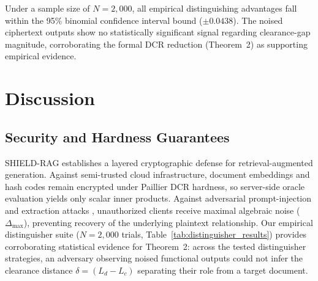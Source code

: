 \documentclass[10pt,a4paper]{article}
\begin{document}
Under a sample size of $N=2{,}000$, all empirical distinguishing advantages fall within the 95\% binomial confidence interval bound ($\pm 0.0438$). The noised ciphertext outputs show no statistically significant signal regarding clearance-gap magnitude, corroborating the formal DCR reduction (Theorem~2) as supporting empirical evidence.

\section{Discussion}
\label{sec:discussion}

\subsection{Security and Hardness Guarantees}
SHIELD-RAG establishes a layered cryptographic defense for retrieval-augmented generation. Against semi-trusted cloud infrastructure, document embeddings and hash codes remain encrypted under Paillier DCR hardness, so server-side oracle evaluation yields only scalar inner products. Against adversarial prompt-injection and extraction attacks \cite{zeng2024good, zhang2025beyondtext}, unauthorized clients receive maximal algebraic noise ($\Delta_{\text{max}}$), preventing recovery of the underlying plaintext relationship. Our empirical distinguisher suite ($N=2{,}000$ trials, Table~\ref{tab:distinguisher_results}) provides corroborating statistical evidence for Theorem~2: across the tested distinguisher strategies, an adversary observing noised functional outputs could not infer the clearance distance $\delta = (L_d - L_c)$ separating their role from a target document.
\end{document}
